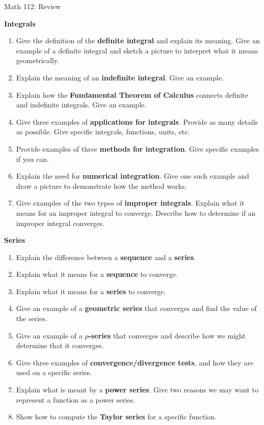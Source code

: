 \documentclass[11pt]{article}
\begin{document}
\begin{center}
\LARGE
\rm{Math 112:  Review}
\\
\end{center}
\vspace{0.2in}
{\bf Integrals}

\begin{enumerate}
\item {Give the definition of the {\bf definite integral} and explain its meaning.  Give an example of a definite integral and sketch a picture
to interpret what it means geometrically.}
\item {Explain the meaning of an {\bf indefinite integral}.  Give an example.}
\item {Explain how the {\bf Fundamental Theorem of Calculus} connects definite and indefinite integrals.  Give an example.}
\item {Give three examples of {\bf applications for integrals}.  Provide as many details as possible.  Give specific integrals, functions, units, etc.}
\item {Provide examples of three {\bf methods for integration}.  Give specific examples if you can.}
\item {Explain the need for {\bf numerical integration}.  Give one such example and draw a picture to demonstrate how the method works.}
\item {Give examples of the two types of {\bf improper integrals}.  Explain what it means for an improper integral to converge.  Describe how to determine if an improper integral converges.}
\end{enumerate}


{\bf Series}

\begin{enumerate}
\item {Explain the difference between a {\bf sequence} and a {\bf series}.}
\item {Explain what it means for a {\bf sequence} to converge.}
\item {Explain what it means for a {\bf series} to converge.}
\item {Give an example of a {\bf geometric series} that converges and find the value of the series.}
\item {Give an example of a {\bf  $p$-series }that converges and describe how we might determine that it converges.}
\item {Give three examples of {\bf convergence/divergence tests}, and how they are used on a specific series.}
\item {Explain what is meant by a {\bf power series}.  Give two reasons we may want to represent a function as a power series.}
\item {Show how to compute the {\bf Taylor series} for a specific function.}
\end{enumerate}
\end{document}
